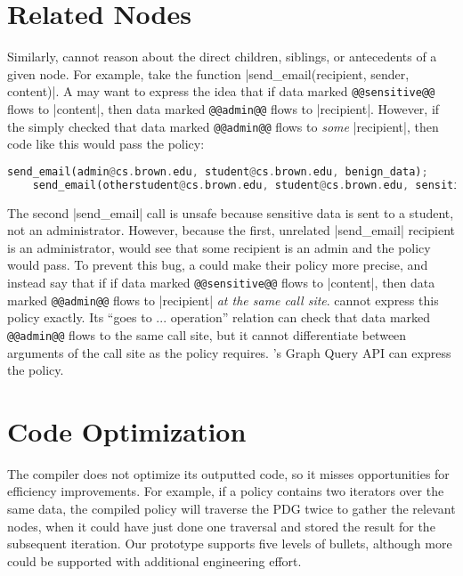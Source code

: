 \section{Related Nodes}
Similarly, \syslang{} cannot reason about the direct children, siblings, or antecedents of a given node.
%
For example, take the function |send_email(recipient, sender, content)|.
%
A \ce{} may want to express the idea that if data marked \lstinline[language=CNL]|@@sensitive@@| flows to |content|,
then data marked \lstinline[language=CNL]|@@admin@@| flows to |recipient|.
%
However, if the \ce{} simply checked that data marked \lstinline[language=CNL]|@@admin@@| flows to \emph{some} |recipient|,
then code like this would pass the policy:
\begin{lstlisting}[language=Rust]
    send_email(admin@cs.brown.edu, student@cs.brown.edu, benign_data);
    send_email(otherstudent@cs.brown.edu, student@cs.brown.edu, sensitive_data)
\end{lstlisting}
The second |send_email| call is unsafe because sensitive data is sent to a student, not an administrator.
%
However, because the first, unrelated |send_email| recipient is an administrator, \sys{} would see that some recipient is an admin and the policy would pass.
%
To prevent this bug, a \ce{} could make their policy more precise, and instead say that if if data marked \lstinline[language=CNL]|@@sensitive@@| flows to |content|,
then data marked \lstinline[language=CNL]|@@admin@@| flows to |recipient| \emph{at the same call site}.
%
\syslang{} cannot express this policy exactly.
%
Its ``goes to ... operation'' relation can check that data marked \lstinline[language=CNL]|@@admin@@| flows to the same call site, but it cannot differentiate between arguments of the call site as the policy requires.
%
\sys{}'s Graph Query API can express the policy.

\section{Code Optimization}
The \syslang{} compiler does not optimize its outputted code, so it misses opportunities for efficiency improvements.
%
For example, if a policy contains two iterators over the same data, the \syslang{} compiled policy will traverse the PDG twice to gather the relevant nodes,
when it could have just done one traversal and stored the result for the subsequent iteration.
%
Our \syslang{} prototype supports five levels of bullets, although more could be supported with additional engineering effort.


